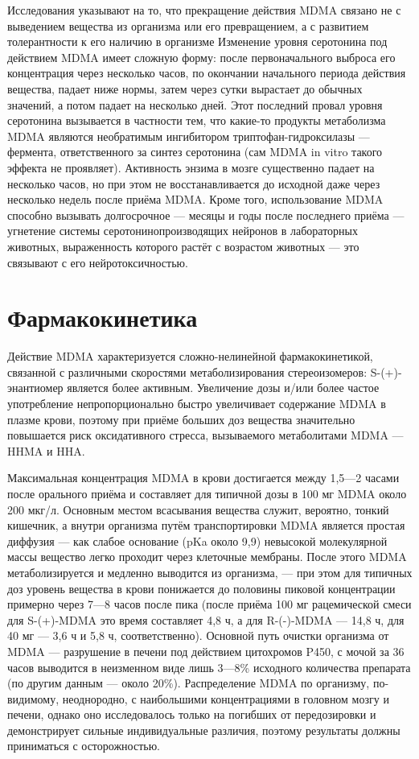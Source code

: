 \documentclass[a4paper,14pt,russian]{report}
\begin{document}
Исследования указывают на то, что прекращение действия MDMA связано не с выведением вещества из организма или его превращением, а с развитием толерантности к его наличию в организме Изменение уровня серотонина под действием MDMA имеет сложную форму: после первоначального выброса его концентрация через несколько часов, по окончании начального периода действия вещества, падает ниже нормы, затем через сутки вырастает до обычных значений, а потом падает на несколько дней. Этот последний провал уровня серотонина вызывается в частности тем, что какие-то продукты метаболизма MDMA являются необратимым ингибитором триптофан-гидроксилазы — фермента, ответственного за синтез серотонина (сам MDMA in vitro такого эффекта не проявляет). Активность энзима в мозге существенно падает на несколько часов, но при этом не восстанавливается до исходной даже через несколько недель после приёма MDMA. Кроме того, использование MDMA способно вызывать долгосрочное — месяцы и годы после последнего приёма — угнетение системы серотонинопроизводящих нейронов в лабораторных животных, выраженность которого растёт с возрастом животных — это связывают с его нейротоксичностью.

\section{Фармакокинетика}

Действие MDMA характеризуется сложно-нелинейной фармакокинетикой, связанной с различными скоростями метаболизирования стереоизомеров: S-(+)-энантиомер является более активным. Увеличение дозы и/или более частое употребление непропорционально быстро увеличивает содержание MDMA в плазме крови, поэтому при приёме больших доз вещества значительно повышается риск оксидативного стресса, вызываемого метаболитами MDMA — HHMA и HHA.

Максимальная концентрация MDMA в крови достигается между 1,5—2 часами после орального приёма и составляет для типичной дозы в 100 мг MDMA около 200 мкг/л. Основным местом всасывания вещества служит, вероятно, тонкий кишечник, а внутри организма путём транспортировки MDMA является простая диффузия — как слабое основание (pKa около 9,9) невысокой молекулярной массы вещество легко проходит через клеточные мембраны. После этого MDMA метаболизируется и медленно выводится из организма, — при этом для типичных доз уровень вещества в крови понижается до половины пиковой концентрации примерно через 7—8 часов после пика (после приёма 100 мг рацемической смеси для S-(+)-MDMA это время составляет 4,8 ч, а для R-(-)-MDMA — 14,8 ч, для 40 мг — 3,6 ч и 5,8 ч, соответственно). Основной путь очистки организма от MDMA — разрушение в печени под действием цитохромов P450, с мочой за 36 часов выводится в неизменном виде лишь 3—8\% исходного количества препарата (по другим данным — около 20\%). Распределение MDMA по организму, по-видимому, неоднородно, с наибольшими концентрациями в головном мозгу и печени, однако оно исследовалось только на погибших от передозировки и демонстрирует сильные индивидуальные различия, поэтому результаты должны приниматься с осторожностью.
\end{document}
